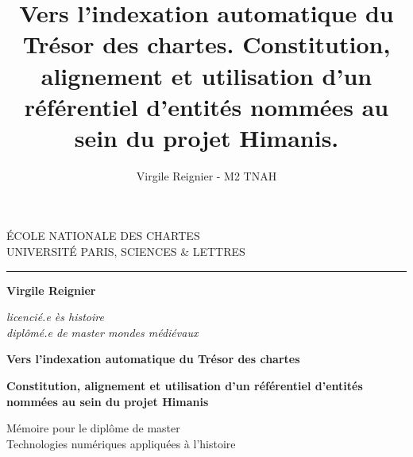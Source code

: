 \documentclass[a4paper,12pt,twoside]{book}
\author{Virgile Reignier - M2 TNAH}
\title{Vers l’indexation automatique du Trésor des chartes. Constitution, alignement et utilisation d'un référentiel d’entités nommées au sein du projet Himanis.}
\begin{document}
	\begin{titlepage}
		\begin{center}
			
			\bigskip
			
			\begin{large}				
				ÉCOLE NATIONALE DES CHARTES\\
				UNIVERSITÉ PARIS, SCIENCES \& LETTRES
			\end{large}
			\begin{center}\rule{2cm}{0.02cm}\end{center}
			
			\bigskip
			\bigskip
			\bigskip
			\begin{Large}
				\textbf{Virgile Reignier}\\
			\end{Large}
			\begin{normalsize} \textit{licencié.e ès histoire}\\
				\textit{diplômé.e de master mondes médiévaux}
			\end{normalsize}
			
			\bigskip
			\bigskip
			\bigskip
			
			\begin{Huge}
				\textbf{Vers l’indexation automatique du Trésor des chartes}\\
			\end{Huge}
			\bigskip
			\bigskip
			\begin{LARGE}
				\textbf{Constitution, alignement et utilisation d'un référentiel d’entités nommées au sein du projet Himanis}\\
			\end{LARGE}
			
			\bigskip
			\bigskip
			\bigskip
			\begin{large}
			\end{large}
			\vfill
			
			\begin{large}
				Mémoire 
				pour le diplôme de master \\
				\og{} Technologies numériques appliquées à l'histoire \fg{} \\
			\end{large}
			
		\end{center}
	\end{titlepage}
	
	\thispagestyle{empty}	
	\cleardoublepage
	
	\frontmatter
\end{document}
